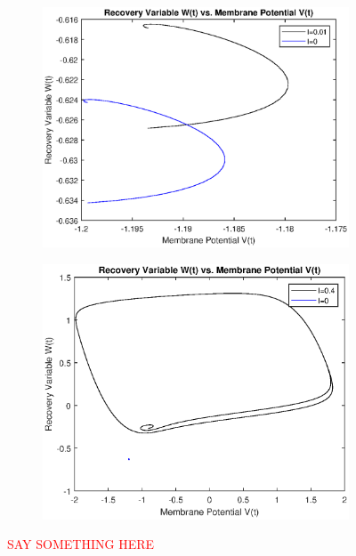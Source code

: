 \documentclass{book}
\theoremstyle{definition}
\begin{document}
\begin{figure}[!htb]
	\centering
	\begin{subfigure}{0.5\textwidth}
		\centering
		\includegraphics[scale=0.6]{FHN_lab/V_W_2.eps}
	\end{subfigure}%
	\begin{subfigure}{0.5\textwidth}
		\centering
		\includegraphics[scale=0.6]{FHN_lab/V_W_3.eps}
		
	\end{subfigure}%
	\caption{\textcolor{red}{SAY SOMETHING HERE}}
	\label{Fig:5}
\end{figure}
\end{document}
